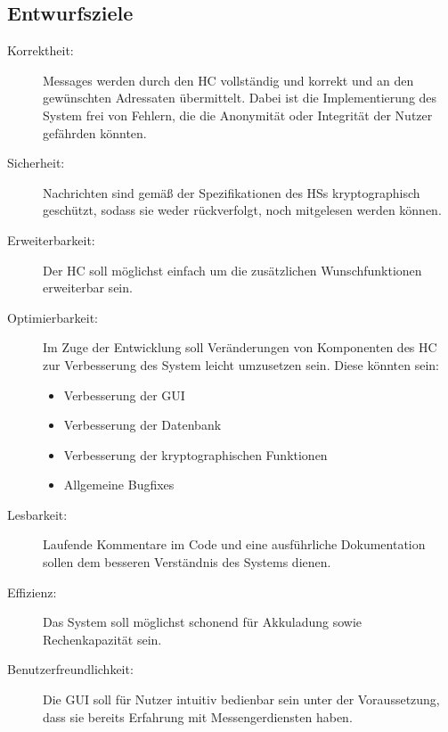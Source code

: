 \subsection{Entwurfsziele}

\begin{description}
	
	\item[Korrektheit:] 
	Messages werden durch den \ac{HC} vollständig und korrekt und an den gewünschten Adressaten übermittelt. Dabei ist die Implementierung des System frei von Fehlern, die die Anonymität oder Integrität der Nutzer gefährden könnten.
	
	\item [Sicherheit:] Nachrichten sind gemäß der Spezifikationen des \acp{HS} kryptographisch geschützt, sodass sie weder rückverfolgt, noch mitgelesen werden können.
	
	\item [Erweiterbarkeit:] Der \ac{HC} soll möglichst einfach um die zusätzlichen Wunschfunktionen erweiterbar sein.
	
	\item [Optimierbarkeit:] Im Zuge der Entwicklung soll Veränderungen von Komponenten des \ac{HC} zur Verbesserung des System leicht umzusetzen sein.
	Diese könnten sein: 
	\begin{itemize}
		\item Verbesserung der \ac{GUI}
		\item Verbesserung der Datenbank
		\item Verbesserung der kryptographischen Funktionen
		\item Allgemeine Bugfixes
	\end{itemize}
	\item [Lesbarkeit:] Laufende Kommentare im Code und eine ausführliche Dokumentation sollen dem besseren Verständnis des Systems dienen.
	
	\item [Effizienz:] Das System soll möglichst schonend für Akkuladung sowie Rechenkapazität sein.
	
	\item [Benutzerfreundlichkeit:]
	Die \ac{GUI} soll für Nutzer intuitiv bedienbar sein unter der Voraussetzung, dass sie bereits Erfahrung mit Messengerdiensten haben.

\end{description}